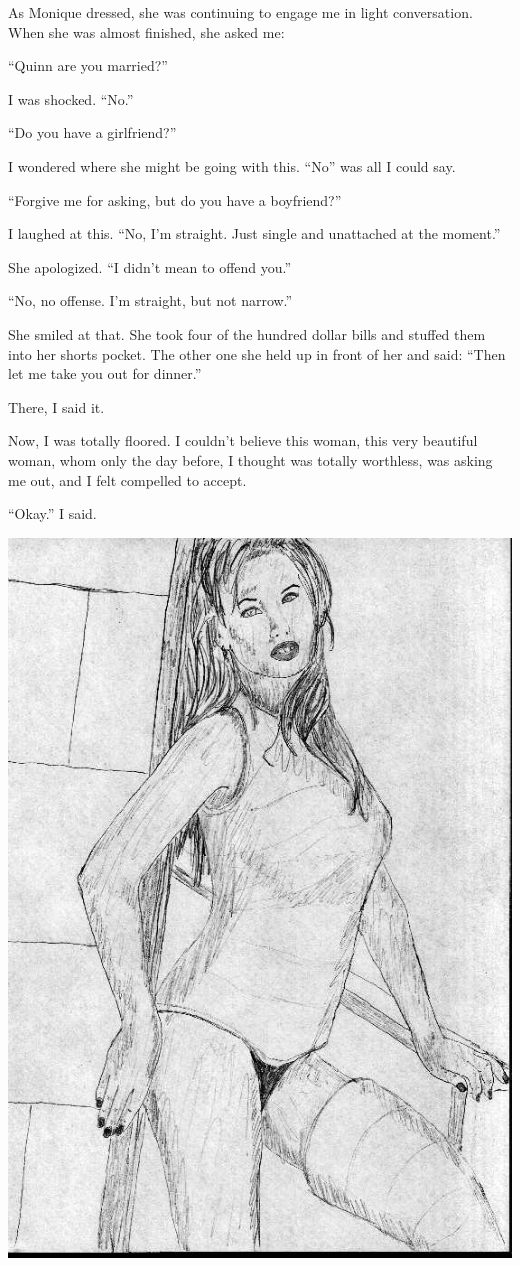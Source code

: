 As Monique dressed, she was continuing to engage me in light conversation. When she was
almost finished, she asked me:

``Quinn are you married?''

I was shocked. ``No.''

``Do you have a girlfriend?''

I wondered where she might be going with this. ``No'' was all I could say.

``Forgive me for asking, but do you have a boyfriend?''

I laughed at this. ``No, I'm straight. Just single and unattached at the moment.''

She apologized. ``I didn't mean to offend you.''

``No, no offense. I'm straight, but not narrow.''

She smiled at that. She took four of the hundred dollar bills and stuffed them into her
shorts pocket. The other one she held up in front of her and said: ``Then let me take you out
for
dinner.''

\begin{thought}
There, I said it.
\end{thought}

Now, I was totally floored. I couldn't believe this woman, this very beautiful woman, whom
only the day before, I thought was totally worthless, was asking me out, and I felt compelled to
accept.

``Okay.'' I said.

\newpage
\begin{center}
\includegraphics{images/kicks11.jpg}
\end{center}
